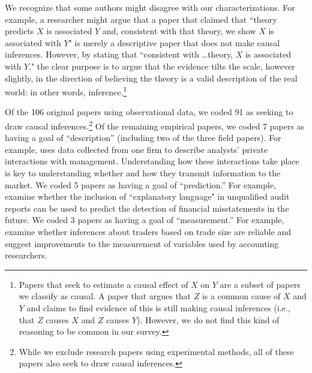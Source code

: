 \documentclass[12pt,reqno,titlepage]{amsart}
\begin{document}
\begin{doublespace}
We recognize that some authors might disagree with our characterizations.
For example, a researcher might argue that a paper that claimed that ``theory predicts $X$ is associated $Y$ and, consistent with that theory, we show $X$ is associated with $Y$" is merely a descriptive paper that does not make causal inferences.
However, by stating that ``consistent with \dots theory, $X$ is associated with $Y$," the clear purpose is to argue that the evidence tilts the scale, however slightly, in the direction of believing the theory is a valid description of the real world: in other words, inference.\footnote{
Papers that seek to estimate a causal effect of $X$ on $Y$ are a subset of papers we classify as causal.
A paper that argues that $Z$ is a common cause of $X$ and $Y$ and claims to find evidence of this is still making causal inferences (i.e., that $Z$ causes $X$ and $Z$ causes $Y$).
However, we do not find this kind of reasoning to be common in our survey.}

Of the 106 original papers using observational data, we coded 91 as seeking to draw causal inferences.\footnote{While we exclude research papers using experimental methods, all of these papers also seek to draw causal inferences.}
Of the remaining empirical papers, we coded 7 papers as having a goal of ``description'' (including two of the three field papers). 
For example, \citet{Soltes:2013ba} uses data collected from one firm to describe analysts' private interactions with management. Understanding how these interactions take place is key to understanding whether and how they transmit information to the market.
We coded 5 papers as having a goal of ``prediction.'' 
For example, \citet{Czerney:2014bv} examine whether the inclusion of ``explanatory language" in unqualified audit reports can be used to predict the detection of financial misstatements in the future.
We coded 3 papers as having a goal of ``measurement.'' 
For example, \citet{Cready:2014ji} examine whether inferences about traders based on trade size are reliable and suggest improvements to the measurement of variables used by accounting researchers.


\end{doublespace}
\end{document}
